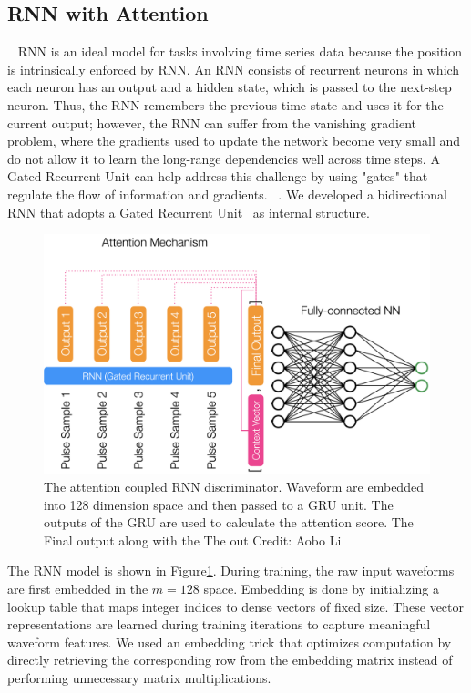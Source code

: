 \subsection{RNN with Attention}~\label{subapp:RNN}
RNN is an ideal model for tasks involving time series data because the position is intrinsically enforced by RNN. \cite{Rumelhart1986} An RNN consists of recurrent neurons in which each neuron has an output and a hidden state, which is passed to the next-step neuron. Thus, the RNN remembers the previous time state and uses it for the current output; however, the RNN can suffer from the vanishing gradient problem, where the gradients used to update the network become very small and do not allow it to learn the long-range dependencies well across time steps. A Gated Recurrent Unit can help address this challenge by using "gates" that regulate the flow of information and gradients. ~\cite{GRU}. We developed a bidirectional RNN that adopts a Gated Recurrent Unit~\cite{GRU} as internal structure.


\begin{figure}[htb!]
    \centering
    \includegraphics[width=0.7\linewidth,trim={0pc 0pc 0pc 0pc},clip]{ch6/figs/rnnAttention.png}
    \caption{The attention coupled RNN discriminator. Waveform are embedded into 128 dimension space and then passed to a GRU unit. The outputs of the GRU are used to calculate the attention score. The Final output along with the   The out Credit: Aobo Li}
    \label{ch6_fig_detail_network}
\end{figure}

The RNN model is shown in Figure\ref{ch6_fig_detail_network}. During training, the raw input waveforms are first embedded in the $m=128$ space. Embedding is done by initializing a lookup table that maps integer indices to dense vectors of fixed size. These vector representations are learned during training iterations to capture meaningful waveform features. We used an embedding trick that optimizes computation by directly retrieving the corresponding row from the embedding matrix instead of performing unnecessary matrix multiplications. 


